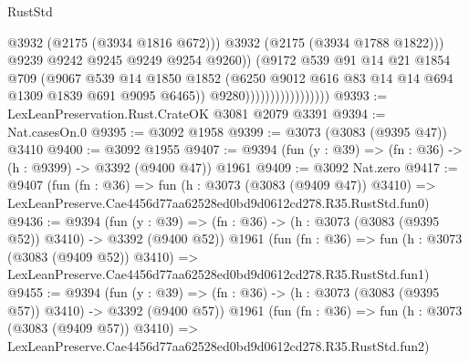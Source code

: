 \begin{lexlean}{RustStd}
\begin{coremodule}
                                            @3932
                                            (@2175 (@3934 @1816 @672)))
                                          @3932
                                          (@2175 (@3934 @1788 @1822)))
                                        @9239
                                        @9242
                                        @9245
                                        @9249
                                        @9254
                                        @9260))
                                    (@9172
                                      @539
                                      @91
                                      @14
                                      @21
                                      @1854
                                      @709
                                      (@9067
                                        @539
                                        @14
                                        @1850
                                        @1852
                                        (@6250
                                          @9012
                                          @616
                                          @83
                                          @14
                                          @14
                                          @694
                                          @1309
                                          @1839
                                          @691
                                          @9095
                                          @6465))
                                      @9280)))))))))))))))))
@9393 := LexLeanPreservation.Rust.CrateOK @3081 @2079 @3391
@9394 := Nat.casesOn.{0}
@9395 := @3092 @1958
@9399 := @3073 (@3083 (@9395 @47)) @3410
@9400 := @3092 @1955
@9407 := @9394 (fun (y : @39) => (fn : @36) -> (h : @9399) -> @3392 (@9400 @47)) @1961
@9409 := @3092 Nat.zero
@9417 := @9407
    (fun (fn : @36) =>
    fun (h : @3073 (@3083 (@9409 @47)) @3410) =>
    LexLeanPreserve.Cae4456d77aa62528ed0bd9d0612cd278.R35.RustStd.fun0)
@9436 := @9394
    (fun (y : @39) => (fn : @36) -> (h : @3073 (@3083 (@9395 @52)) @3410) -> @3392 (@9400 @52))
    @1961
    (fun (fn : @36) =>
    fun (h : @3073 (@3083 (@9409 @52)) @3410) =>
    LexLeanPreserve.Cae4456d77aa62528ed0bd9d0612cd278.R35.RustStd.fun1)
@9455 := @9394
    (fun (y : @39) => (fn : @36) -> (h : @3073 (@3083 (@9395 @57)) @3410) -> @3392 (@9400 @57))
    @1961
    (fun (fn : @36) =>
    fun (h : @3073 (@3083 (@9409 @57)) @3410) =>
    LexLeanPreserve.Cae4456d77aa62528ed0bd9d0612cd278.R35.RustStd.fun2)

\end{coremodule}
\end{lexlean}
